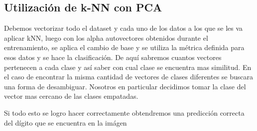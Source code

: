 
\subsection{Utilización de k-NN con PCA}

Debemos vectorizar todo el dataset y cada uno de los
datos a los que se les va aplicar kNN, luego con los alpha autovectores
obtenidos durante el entrenamiento, se aplica el cambio de base y se utiliza la
métrica definida para esos datos y se hace la clasificación. De aquí sabremos cuantos vectores pertenecen a cada clase y así saber con cual clase se encuentra mas similitud. En el caso de encontrar la misma cantidad de vectores de clases diferentes se buscara una forma de desambiguar. Nosotros en particular decidimos tomar la clase del vector mas cercano de las clases empatadas.

Si todo esto se logro hacer correctamente obtendremos una predicción correcta
del dígito que se encuentra en la imágen